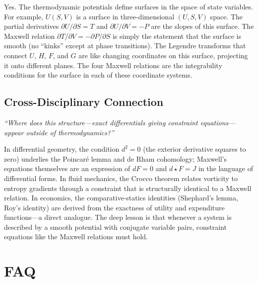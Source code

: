 Yes. The thermodynamic potentials define surfaces in the space of state variables. For example, $U(S,V)$ is a surface in three-dimensional $(U, S, V)$ space. The partial derivatives $\partial U/\partial S = T$ and $\partial U/\partial V = -P$ are the slopes of this surface. The Maxwell relation $\partial T/\partial V = -\partial P/\partial S$ is simply the statement that the surface is smooth (no ``kinks'' except at phase transitions). The Legendre transforms that connect $U$, $H$, $F$, and $G$ are like changing coordinates on this surface, projecting it onto different planes. The four Maxwell relations are the integrability conditions for the surface in each of these coordinate systems.

\subsection*{Cross-Disciplinary Connection}
\textit{``Where does this structure---exact differentials giving constraint equations---appear outside of thermodynamics?''}

In differential geometry, the condition $d^{2} = 0$ (the exterior derivative squares to zero) underlies the Poincaré lemma and de Rham cohomology; Maxwell's equations themselves are an expression of $dF = 0$ and $d{\star}F = J$ in the language of differential forms. In fluid mechanics, the Crocco theorem relates vorticity to entropy gradients through a constraint that is structurally identical to a Maxwell relation. In economics, the comparative-statics identities (Shephard's lemma, Roy's identity) are derived from the exactness of utility and expenditure functions---a direct analogue. The deep lesson is that whenever a system is described by a smooth potential with conjugate variable pairs, constraint equations like the Maxwell relations must hold.

\section*{FAQ}

